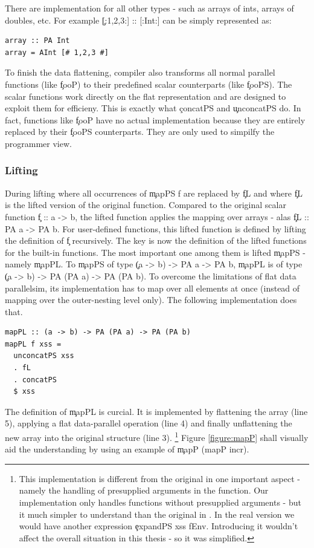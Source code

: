       
      There are implementation for all other types - such as arrays of ints,
      arrays of doubles, etc. For example \c{[:1,2,3:] :: [:Int:]} can be simply
      represented as:
      \begin{lstlisting}
array :: PA Int
array = AInt [# 1,2,3 #]
      \end{lstlisting}
      
      To finish the data flattening, compiler also transforms
      all normal parallel functions (like \c{fooP}) to
      their predefined scalar counterparts (like \c{fooPS}).
      The scalar functions work directly on the flat representation
      and are designed to exploit them for efficieny.
      This is exactly what \c{concatPS} and \c{unconcatPS} do.
      In fact, functions like \c{fooP} have no actual implementation
      because they are entirely replaced by their \c{fooPS} counterparts.
      They are only used to simpilfy the programmer view.
    
      
    \subsubsection{Lifting}
      During lifting where all occurrences of \c{mapPS f} are
      replaced by \c{fL} and where \c{fL}
      is the lifted version of the original function.
      Compared to the original scalar function \c{f :: a -> b}, the lifted
      function applies the mapping over arrays - alas \c{fL :: PA a -> PA b}.
      For user-defined functions, this lifted function is defined
      by lifting the definition of \c{f} recursively.
      The key is now the definition of the lifted functions for the built-in functions.
      The most important one among them is lifted \c{mapPS} - namely \c{mapPL}.
      To \c{mapPS} of type \c{(a -> b) -> PA a -> PA b},
      \c{mapPL} is of type \c{(a -> b) -> PA (PA a) -> PA (PA b)}.
      To overcome the limitations of flat data parallelsim,
      its implementation has to map over all elements at once
      (instead of mapping over the outer-nesting level only).
      The following implementation does that.
    \begin{lstlisting}
mapPL :: (a -> b) -> PA (PA a) -> PA (PA b)
mapPL f xss =
  unconcatPS xss
  . fL
  . concatPS
  $ xss
    \end{lstlisting}
    The definition of \c{mapPL} is curcial. It is implemented by flattening the array (line 5), applying a flat data-parallel operation (line 4)
    and finally unflattening the new array into the original structure (line 3).
    \footnote{This implementation is different from the original in one important aspect - 
    namely the handling of presupplied arguments in the function. Our
    implementation only handles functions without presupplied arguments -
    but it much simpler to understand than the original in \cite{Harness2008}.
    In the real version we would have another expression \c{expandPS xss fEnv}.
    Introducing it wouldn't affect the overall situation in this thesis -
    so it was simplified.
    }
    Figure \ref{figure:mapP} shall visually aid the understanding by using
    an example of \c{mapP (mapP incr)}.
    
